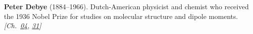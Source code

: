 \nobelchemistry \textbf{Peter Debye} (1884–1966). Dutch-American physicist and chemist who received the 1936 Nobel Prize for studies on molecular structure and dipole moments. \emph{[Ch.~\hyperref[ch:energytransmission]{04}, \hyperref[ch:osmosisdebye]{31}]}

